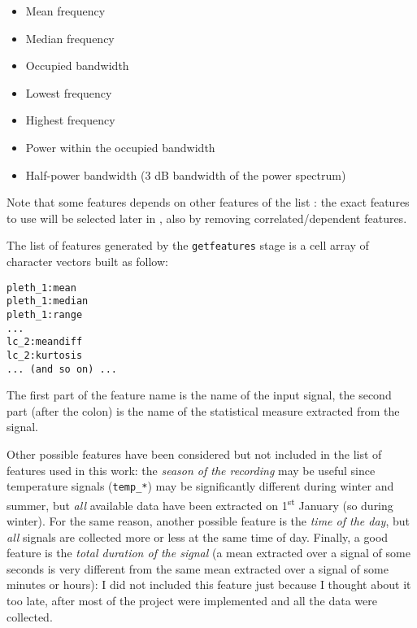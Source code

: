 \noindent\underline{}
\begin{multicols}{2}
\begin{itemize}
\item Mean frequency
\item Median frequency
\item Occupied bandwidth
\item Lowest frequency
\item Highest frequency
\item Power within the occupied bandwidth
\item Half-power bandwidth (3 dB bandwidth of the power spectrum)
\end{itemize}
\end{multicols}

Note that some features depends on other features of the list : the exact features to use will be selected
later in , also by removing correlated/dependent
features.

The list of features generated by the \texttt{getfeatures} stage is a cell
array of character vectors built as follow:
\begin{verbatim}
pleth_1:mean
pleth_1:median
pleth_1:range
...
lc_2:meandiff
lc_2:kurtosis
... (and so on) ...
\end{verbatim}
The first part of the feature name is the name of the input signal, the second
part (after the colon) is the name of the statistical measure extracted from
the signal.

Other possible features have been considered but not included in the list of
features used in this work: the \emph{season of the recording} may be useful
since temperature signals (\texttt{temp\_*}) may be significantly different
during winter and summer, but \emph{all} available data have been extracted on
1\textsuperscript{st} January (so during winter). For the same reason, another
possible feature is the \emph{time of the day}, but \emph{all} signals are
collected more or less at the same time of day. Finally, a good feature is the
\emph{total duration of the signal} (a mean extracted over a signal of some
seconds is very different from the same mean extracted over a signal of some
minutes or hours): I did not included this feature just because I thought about
it too late, after most of the project were implemented and all the data were
collected.

